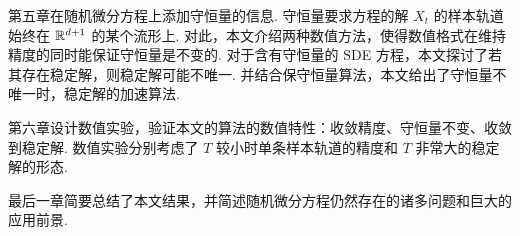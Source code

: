 第五章在随机微分方程上添加守恒量的信息. 守恒量要求方程的解 $X_t$ 的样本轨道始终在 $\mathbb{R}^{d+1}$ 的某个流形上. 对此，本文介绍两种数值方法，使得数值格式在维持精度的同时能保证守恒量是不变的. 对于含有守恒量的 SDE 方程，本文探讨了若其存在稳定解，则稳定解可能不唯一. 并结合保守恒量算法，本文给出了守恒量不唯一时，稳定解的加速算法. 

第六章设计数值实验，验证本文的算法的数值特性：收敛精度、守恒量不变、收敛到稳定解. 数值实验分别考虑了 $T$ 较小时单条样本轨道的精度和 $T$ 非常大的稳定解的形态. 

最后一章简要总结了本文结果，并简述随机微分方程仍然存在的诸多问题和巨大的应用前景. 


















